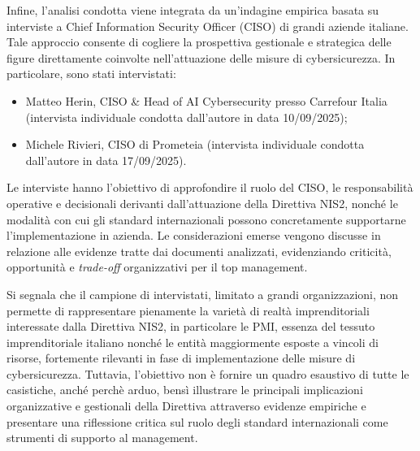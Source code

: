 Infine, l’analisi condotta viene integrata da un’indagine empirica basata su interviste a Chief Information Security Officer (CISO) di grandi aziende italiane.
Tale approccio consente di cogliere la prospettiva gestionale e strategica delle figure direttamente coinvolte nell’attuazione delle misure di cybersicurezza. 
In particolare, sono stati intervistati:
\begin{itemize}
    \item Matteo Herin, CISO \& Head of AI Cybersecurity presso Carrefour Italia (intervista individuale condotta dall'autore in data 10/09/2025);
    \item Michele Rivieri, CISO di Prometeia (intervista individuale condotta dall'autore in data 17/09/2025).
\end{itemize}
Le interviste hanno l’obiettivo di approfondire il ruolo del CISO, le responsabilità operative e decisionali derivanti dall’attuazione della Direttiva NIS2, 
nonché le modalità con cui gli standard internazionali possono concretamente supportarne l’implementazione in azienda. Le considerazioni emerse vengono 
discusse in relazione alle evidenze tratte dai documenti analizzati, evidenziando criticità, opportunità e \textit{trade-off} organizzativi per il 
top management.

Si segnala che il campione di intervistati, limitato a grandi organizzazioni, non permette di rappresentare pienamente la varietà di realtà 
imprenditoriali interessate dalla Direttiva NIS2, in particolare le PMI, essenza del tessuto imprenditoriale italiano nonché le entità maggiormente 
esposte a vincoli di risorse, fortemente rilevanti in fase di implementazione delle misure di cybersicurezza. Tuttavia, l’obiettivo non è fornire 
un quadro esaustivo di tutte le casistiche, anché perchè arduo, bensì illustrare le principali implicazioni organizzative e gestionali della Direttiva 
attraverso evidenze empiriche e presentare una riflessione critica sul ruolo degli standard internazionali come strumenti di supporto al management.
